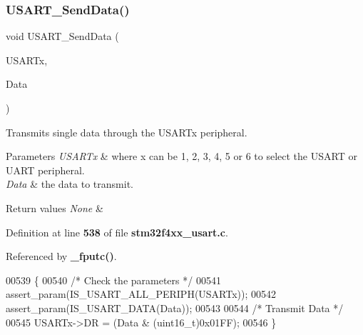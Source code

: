\subsubsection{U\+S\+A\+R\+T\+\_\+\+Send\+Data()}
{\footnotesize\ttfamily void U\+S\+A\+R\+T\+\_\+\+Send\+Data (\begin{DoxyParamCaption}\item[{\textbf{ U\+S\+A\+R\+T\+\_\+\+Type\+Def} $\ast$}]{U\+S\+A\+R\+Tx,  }\item[{uint16\+\_\+t}]{Data }\end{DoxyParamCaption})}



Transmits single data through the U\+S\+A\+R\+Tx peripheral. 


\begin{DoxyParams}{Parameters}
{\em U\+S\+A\+R\+Tx} & where x can be 1, 2, 3, 4, 5 or 6 to select the U\+S\+A\+RT or U\+A\+RT peripheral. \\
\hline
{\em Data} & the data to transmit. \\
\hline
\end{DoxyParams}

\begin{DoxyRetVals}{Return values}
{\em None} & \\
\hline
\end{DoxyRetVals}


Definition at line \textbf{ 538} of file \textbf{ stm32f4xx\+\_\+usart.\+c}.



Referenced by \textbf{ \+\_\+fputc()}.


\begin{DoxyCode}
00539 \{
00540   \textcolor{comment}{/* Check the parameters */}
00541   assert_param(IS_USART_ALL_PERIPH(USARTx));
00542   assert_param(IS_USART_DATA(Data)); 
00543     
00544   \textcolor{comment}{/* Transmit Data */}
00545   USARTx->DR = (Data & (uint16\_t)0x01FF);
00546 \}
\end{DoxyCode}
